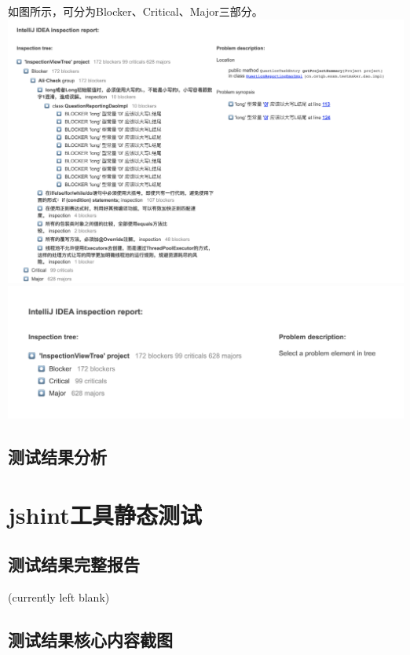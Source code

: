 \documentclass[hyperref, a4paper]{ctexart}
\begin{document}
如图所示，可分为Blocker、Critical、Major三部分。
\includegraphics{screenshots/pic1.jpg}
\includegraphics{screenshots/pic2.jpg}

\hypertarget{ux6d4bux8bd5ux7ed3ux679cux5206ux6790-1}{%
\subsection{测试结果分析}\label{ux6d4bux8bd5ux7ed3ux679cux5206ux6790-1}}

\hypertarget{jshintux5de5ux5177ux9759ux6001ux6d4bux8bd5}{%
\section{jshint工具静态测试}\label{jshintux5de5ux5177ux9759ux6001ux6d4bux8bd5}}

\hypertarget{ux6d4bux8bd5ux7ed3ux679cux5b8cux6574ux62a5ux544a-2}{%
\subsection{测试结果完整报告}\label{ux6d4bux8bd5ux7ed3ux679cux5b8cux6574ux62a5ux544a-2}}

(currently left blank)

\hypertarget{ux6d4bux8bd5ux7ed3ux679cux6838ux5fc3ux5185ux5bb9ux622aux56fe-2}{%
\subsection{测试结果核心内容截图}\label{ux6d4bux8bd5ux7ed3ux679cux6838ux5fc3ux5185ux5bb9ux622aux56fe-2}}
\end{document}
